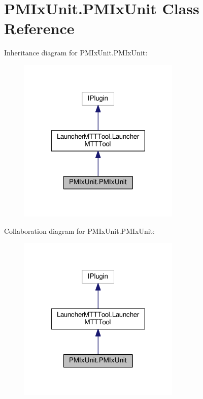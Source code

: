 \hypertarget{class_p_m_ix_unit_1_1_p_m_ix_unit}{\section{P\-M\-Ix\-Unit.\-P\-M\-Ix\-Unit Class Reference}
\label{class_p_m_ix_unit_1_1_p_m_ix_unit}
}


Inheritance diagram for P\-M\-Ix\-Unit.\-P\-M\-Ix\-Unit\-:
\nopagebreak
\begin{figure}[H]
\begin{center}
\leavevmode
\includegraphics[width=218pt]{class_p_m_ix_unit_1_1_p_m_ix_unit__inherit__graph}
\end{center}
\end{figure}


Collaboration diagram for P\-M\-Ix\-Unit.\-P\-M\-Ix\-Unit\-:
\nopagebreak
\begin{figure}[H]
\begin{center}
\leavevmode
\includegraphics[width=218pt]{class_p_m_ix_unit_1_1_p_m_ix_unit__coll__graph}
\end{center}
\end{figure}
